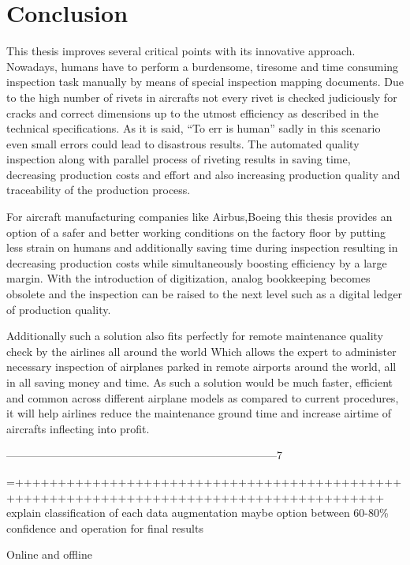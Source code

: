 \documentclass{article}
\begin{document}
\section{Conclusion}

This thesis improves several critical points with its innovative approach. Nowadays, humans have to perform a burdensome, tiresome and time consuming inspection task manually by means of special inspection mapping documents. Due to the high number of rivets in aircrafts not every rivet is checked judiciously for cracks and correct dimensions up to the utmost efficiency as described in the technical specifications.
As it is said, “To err is human” sadly in this scenario even small errors could lead to disastrous results.
The automated quality inspection along with parallel process of riveting results in saving time, decreasing production costs and effort and also increasing production quality and traceability of the production process.

For aircraft manufacturing companies like Airbus,Boeing this thesis provides an option of a safer and better working conditions on the factory floor by putting less strain on humans and
additionally saving time during inspection resulting in decreasing production costs
while simultaneously boosting efficiency by a large margin.
With the introduction of digitization, analog bookkeeping becomes obsolete and the
inspection can be raised to the next level such as a digital ledger of production
quality.


Additionally such a solution also fits perfectly for remote maintenance quality
check by the airlines all around the world Which allows the expert to administer necessary inspection of airplanes parked in remote airports around the world, all in all saving money and time.
As such a solution would be much faster, efficient and common across different airplane models as compared to current procedures, it will help airlines reduce the maintenance ground time and increase airtime of aircrafts inflecting into profit.




--------------------------------------------------------------------------7

=+++++++++++++++++++++++++++++++++++++++++++++++++++++++++++++++++++++++++++++++++++++++++
explain classification of each data augmentation
maybe option between 60-80\% confidence
and operation for final results 

Online and offline
\end{document}
